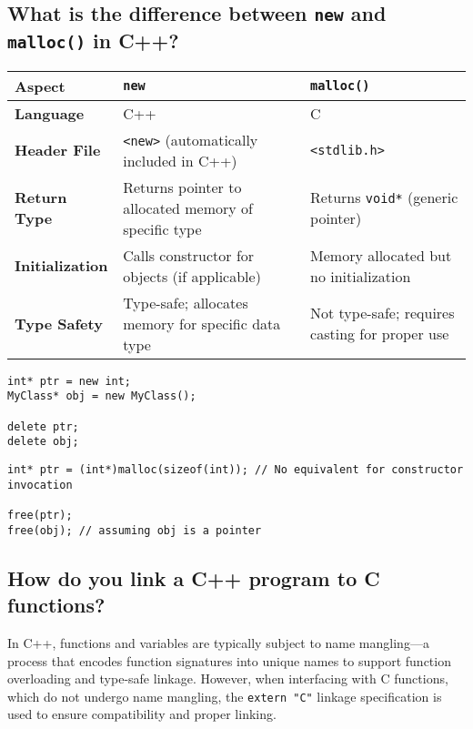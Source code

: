 \subsection{What is the difference between \texttt{new} and \texttt{malloc()} in C++?}
\begin{tabularx}{\textwidth}{|p{2.5cm}|X|X|}
    \hline \rowcolor{tableheader}
    \textbf{Aspect}         & \texttt{new}                                          & \texttt{malloc()}                                    \\
    \hline
    \textbf{Language}       & C++                                                   & C                                                     \\
    \hline
    \textbf{Header File}    & \texttt{<new>} (automatically included in C++)       & \texttt{<stdlib.h>}                                   \\
    \hline
    \textbf{Return Type}    & Returns pointer to allocated memory of specific type & Returns \texttt{void*} (generic pointer)               \\
    \hline
    \textbf{Initialization}& Calls constructor for objects (if applicable)         & Memory allocated but no initialization                \\
    \hline
    \textbf{Type Safety}    & Type-safe; allocates memory for specific data type   & Not type-safe; requires casting for proper use         \\
    \hline
\end{tabularx}

\begin{tcolorbox}[title=new]
\begin{verbatim}
int* ptr = new int;
MyClass* obj = new MyClass();

delete ptr;
delete obj;
\end{verbatim}
\end{tcolorbox}

\begin{tcolorbox}[title=malloc]
\begin{verbatim}
int* ptr = (int*)malloc(sizeof(int)); // No equivalent for constructor invocation

free(ptr);
free(obj); // assuming obj is a pointer
\end{verbatim}
\end{tcolorbox}


\subsection{How do you link a C++ program to C functions?}
In C++, functions and variables are typically subject to name mangling—a process that encodes function signatures into unique names to support function overloading and type-safe linkage. However, when interfacing with C functions, which do not undergo name mangling, the \texttt{extern "C"} linkage specification is used to ensure compatibility and proper linking.

